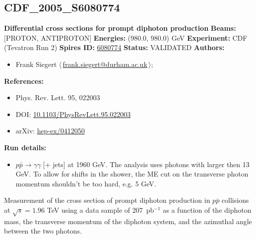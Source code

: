 \clearpage


\clearpage

\subsection[CDF\_2005\_S6080774]{CDF\_2005\_S6080774\,\cite{Acosta:2004sn}}
\textbf{Differential cross sections for prompt diphoton production}\newline
\textbf{Beams:} [PROTON, ANTIPROTON] \newline
\textbf{Energies:} (980.0, 980.0) GeV \newline
\textbf{Experiment:} CDF (Tevatron Run 2) \newline
\textbf{Spires ID:} \href{http://www.slac.stanford.edu/spires/find/hep/www?rawcmd=key+6080774}{6080774}\newline
\textbf{Status:} VALIDATED\newline
\textbf{Authors:}
\begin{itemize}
  \item Frank Siegert $\langle\,$\href{mailto:frank.siegert@durham.ac.uk}{frank.siegert@durham.ac.uk}$\,\rangle$;
\end{itemize}
\textbf{References:}
\begin{itemize}
  \item Phys. Rev. Lett. 95, 022003
  \item DOI: \href{http://dx.doi.org/10.1103/PhysRevLett.95.022003}{10.1103/PhysRevLett.95.022003}
  \item arXiv: \href{http://arxiv.org/abs/hep-ex/0412050}{hep-ex/0412050}
\end{itemize}
\textbf{Run details:}
\begin{itemize}

  \item $p \bar{p} \to \gamma \gamma$ [+ jets] at 1960 GeV. The analysis uses photons with \pT larger then 13 GeV. To allow for shifts in the shower, the ME cut on the transverse photon momentum shouldn't be too hard, e.g. 5 GeV.\end{itemize}

\noindent Measurement of the cross section of prompt diphoton production in $p\bar{p}$ collisions at $\sqrt{s} = 1.96$ TeV using a data sample of 207~pb$^{-1}$ as a function of the diphoton mass, the transverse momentum of the diphoton system, and the azimuthal angle between the two photons.

\clearpage



